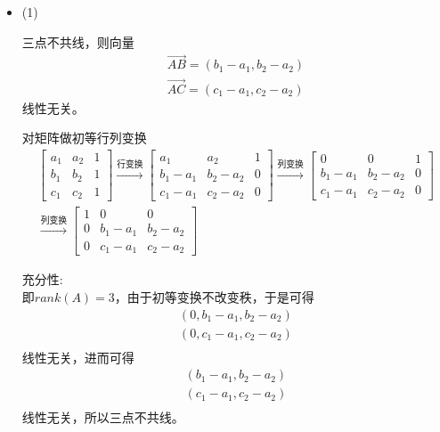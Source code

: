 \documentclass{article}
\begin{document}
\begin{itemize}
  \item (1)

        三点不共线，则向量
        \begin{align*}
          \overrightarrow{AB} = (b_1 - a_1, b_2 - a_2) \\
          \overrightarrow{AC} = (c_1 - a_1, c_2 - a_2)
        \end{align*}
        线性无关。

        对矩阵做初等行列变换
        \begin{align*}
          \begin{bmatrix}
            a_1 & a_2 & 1 \\
            b_1 & b_2 & 1 \\
            c_1 & c_2 & 1
          \end{bmatrix}
          \xrightarrow{\text{行变换}}
          \begin{bmatrix}
            a_1       & a_2       & 1 \\
            b_1 - a_1 & b_2 - a_2 & 0 \\
            c_1 - a_1 & c_2 - a_2 & 0
          \end{bmatrix}
          \xrightarrow{\text{列变换}}
          \begin{bmatrix}
            0         & 0         & 1 \\
            b_1 - a_1 & b_2 - a_2 & 0 \\
            c_1 - a_1 & c_2 - a_2 & 0
          \end{bmatrix} \\
          \xrightarrow{\text{列变换}}
          \begin{bmatrix}
            1 & 0         & 0         \\
            0 & b_1 - a_1 & b_2 - a_2 \\
            0 & c_1 - a_1 & c_2 - a_2
          \end{bmatrix}
        \end{align*}

        充分性: \\
        即$rank(A) = 3$，由于初等变换不改变秩，于是可得
        \begin{align*}
          (0, b_1 - a_1, b_2 - a_2) \\
          (0, c_1 - a_1, c_2 - a_2) \\
        \end{align*}
        线性无关，进而可得
        \begin{align*}
          (b_1 - a_1, b_2 - a_2) \\
          (c_1 - a_1, c_2 - a_2) \\
        \end{align*}
        线性无关，所以三点不共线。


\end{itemize}
\end{document}
